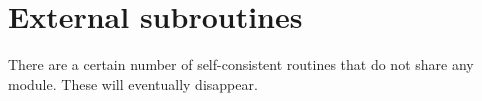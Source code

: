 % 
% 
% 
\section{External subroutines}

There are a certain number of self-consistent routines that do not share
any module. These will eventually disappear.



% 
% 


